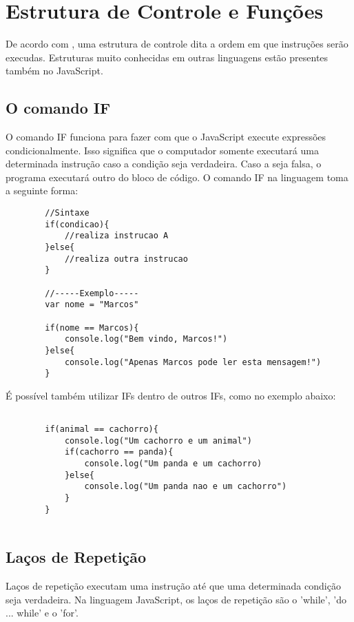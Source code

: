 	
	\section{Estrutura de Controle e Funções}
	De acordo com \cite{flanagan2020javascript}, uma estrutura de controle dita a ordem em que instruções serão execudas. Estruturas muito conhecidas em outras linguagens estão presentes também no JavaScript.
	
	\subsection{O comando IF}
	O comando IF funciona para fazer com que o JavaScript execute expressões condicionalmente. Isso significa que o computador somente executará uma determinada instrução caso a condição seja verdadeira. Caso a seja falsa, o programa executará outro do bloco de código.
	O comando IF na linguagem toma a seguinte forma:
	\newline
	
	\begin{lstlisting}
		//Sintaxe
		if(condicao){
			//realiza instrucao A
		}else{
			//realiza outra instrucao
		}
		
		//-----Exemplo-----
		var nome = "Marcos"
		
		if(nome == Marcos){
			console.log("Bem vindo, Marcos!")
		}else{
			console.log("Apenas Marcos pode ler esta mensagem!")
		}
	\end{lstlisting}
	
	É possível também utilizar IFs dentro de outros IFs, como no exemplo abaixo:
	\newline
	\begin{lstlisting}
	
		if(animal == cachorro){
			console.log("Um cachorro e um animal")
			if(cachorro == panda){
				console.log("Um panda e um cachorro)
			}else{
				console.log("Um panda nao e um cachorro")
			}
		}
		
	\end{lstlisting}
	
	\subsection{Laços de Repetição}
	Laços de repetição executam uma instrução até que uma determinada condição seja verdadeira. Na linguagem JavaScript, os laços de repetição são o 'while', 'do ... while' e o 'for'.
	\newline
	\newline
	
